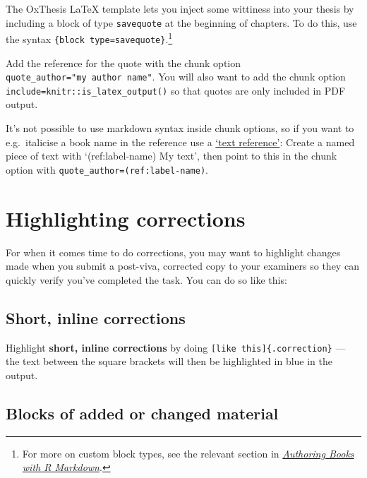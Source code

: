 \documentclass[a4paper, twoside]{templates/ociamthesis}
\begin{document}
The OxThesis LaTeX template lets you inject some wittiness into your thesis by including a block of type \texttt{savequote} at the beginning of chapters.
To do this, use the syntax \texttt{\textasciigrave{}\textasciigrave{}\textasciigrave{}\{block\ type=\textquotesingle{}savequote\textquotesingle{}\}}.\footnote{For more on custom block types, see the relevant section in \href{https://bookdown.org/yihui/bookdown/custom-blocks.html}{\emph{Authoring Books with R Markdown}}.}

Add the reference for the quote with the chunk option \texttt{quote\_author="my\ author\ name"}.
You will also want to add the chunk option \texttt{include=knitr::is\_latex\_output()} so that quotes are only included in PDF output.

It's not possible to use markdown syntax inside chunk options, so if you want to e.g.~italicise a book name in the reference use a \href{https://bookdown.org/yihui/bookdown/markdown-extensions-by-bookdown.html\#text-references}{`text reference'}: Create a named piece of text with `(ref:label-name) My text', then point to this in the chunk option with \texttt{quote\_author=\textquotesingle{}(ref:label-name)\textquotesingle{}}.

\hypertarget{highlighting-corrections}{%
\section{Highlighting corrections}\label{highlighting-corrections}}

For when it comes time to do corrections, you may want to highlight changes made when you submit a post-viva, corrected copy to your examiners so they can quickly verify you've completed the task.
You can do so like this:

\hypertarget{short-inline-corrections}{%
\subsection{Short, inline corrections}\label{short-inline-corrections}}

Highlight \textbf{short, inline corrections} by doing \texttt{{[}like\ this{]}\{.correction\}} --- the text between the square brackets will then \colorbox[HTML]{CCCCFF}{be highlighted in blue} in the output.

\hypertarget{blocks-of-added-or-changed-material}{%
\subsection{Blocks of added or changed material}\label{blocks-of-added-or-changed-material}}
\end{document}
